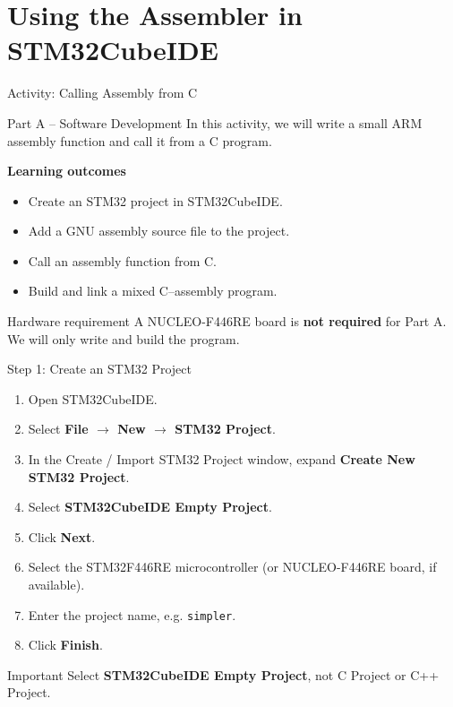 \documentclass[9pt,aspectratio=169,xcolor=table]{beamer}
\begin{document}
\section{Using the Assembler in STM32CubeIDE}



\begin{frame}{Activity: Calling Assembly from C}
	\begin{block}{Part A -- Software Development}
		In this activity, we will write a small ARM assembly
		function and call it from a C program.
	\end{block}

	\textbf{Learning outcomes}
	\begin{itemize}
		\item Create an STM32 project in STM32CubeIDE.
		\item Add a GNU assembly source file to the project.
		\item Call an assembly function from C.
		\item Build and link a mixed C--assembly program.
	\end{itemize}

	\begin{alertblock}{Hardware requirement}
		A NUCLEO-F446RE board is \textbf{not required} for Part A.
		We will only write and build the program.
	\end{alertblock}
\end{frame}


\begin{frame}{Step 1: Create an STM32 Project}
	\begin{enumerate}
		\item Open STM32CubeIDE.
		\item Select \textbf{File $\rightarrow$ New
			$\rightarrow$ STM32 Project}.
		\item In the Create / Import STM32 Project window,
		expand \textbf{Create New STM32 Project}.
		\item Select \textbf{STM32CubeIDE Empty Project}.
		\item Click \textbf{Next}.
		\item Select the STM32F446RE microcontroller
		(or NUCLEO-F446RE board, if available).
		\item Enter the project name, e.g. \texttt{simpler}.
		\item Click \textbf{Finish}.
	\end{enumerate}

	\begin{block}{Important}
		Select \textbf{STM32CubeIDE Empty Project}, not
		C Project or C++ Project.
	\end{block}
\end{frame}
\end{document}

